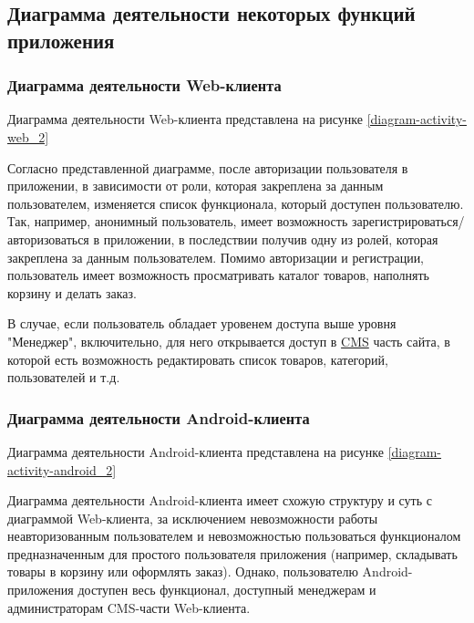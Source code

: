 \subsection{Диаграмма деятельности некоторых функций приложения}\label{subsec:2-activity-diagram}\indent

\subsubsection{Диаграмма деятельности Web-клиента}\indent

Диаграмма деятельности Web-клиента представлена на рисунке \ref{diagram-activity-web_2}
\clearpage
\begin{sidewaysfigure}

\end{sidewaysfigure}
\clearpage

Согласно представленной диаграмме, после авторизации пользователя в приложении, в зависимости от роли, которая закреплена за данным пользователем, изменяется список функционала, 
который доступен пользователю.
Так, например, анонимный пользователь, имеет возможность зарегистрироваться/авторизоваться в приложении, в последствии получив одну из ролей, которая закреплена за данным пользователем.
Помимо авторизации и регистрации, пользователь имеет возможность просматривать каталог товаров, наполнять корзину и делать заказ.

В случае, если пользователь обладает уровенем доступа выше уровня "Менеджер", включительно, для него открывается доступ в \hyperlink{gloss:cms}{CMS} часть сайта, 
в которой есть возможность редактировать список товаров, категорий, пользователей и т.д.


\subsubsection{Диаграмма деятельности Android-клиента}\indent

Диаграмма деятельности Android-клиента представлена на рисунке \ref{diagram-activity-android_2}

\clearpage
\begin{sidewaysfigure}

\end{sidewaysfigure}
\clearpage

Диаграмма деятельности Android-клиента имеет схожую структуру и суть с диаграммой Web-клиента, за исключением невозможности работы неавторизованным пользователем 
и невозможностью пользоваться функционалом предназначенным для простого пользователя приложения (например, складывать товары в корзину или оформлять заказ). 
Однако, пользователю Android-приложения доступен весь функционал, доступный менеджерам и администраторам CMS-части Web-клиента. 
